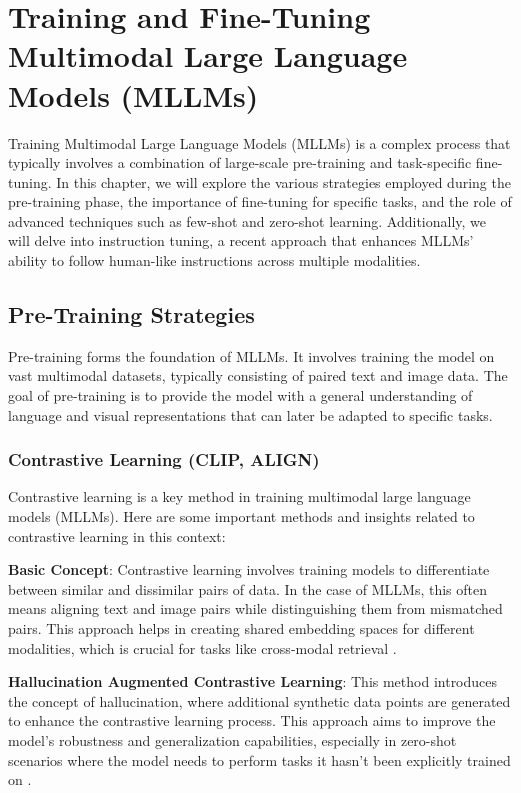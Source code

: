 \chapter{Training and Fine-Tuning Multimodal Large Language Models (MLLMs)}

Training Multimodal Large Language Models (MLLMs) is a complex process that typically involves a combination of large-scale pre-training and task-specific fine-tuning. In this chapter, we will explore the various strategies employed during the pre-training phase, the importance of fine-tuning for specific tasks, and the role of advanced techniques such as few-shot and zero-shot learning. Additionally, we will delve into instruction tuning, a recent approach that enhances MLLMs' ability to follow human-like instructions across multiple modalities.

\section{Pre-Training Strategies}

Pre-training forms the foundation of MLLMs. It involves training the model on vast multimodal datasets, typically consisting of paired text and image data. The goal of pre-training is to provide the model with a general understanding of language and visual representations that can later be adapted to specific tasks.

\subsection{Contrastive Learning (CLIP, ALIGN)}

Contrastive learning is a key method in training multimodal large language models (MLLMs). Here are some important methods and insights related to contrastive learning in this context:

\textbf{Basic Concept}: Contrastive learning involves training models to differentiate between similar and dissimilar pairs of data. In the case of MLLMs, this often means aligning text and image pairs while distinguishing them from mismatched pairs. This approach helps in creating shared embedding spaces for different modalities, which is crucial for tasks like cross-modal retrieval \cite{cite4}.

\textbf{Hallucination Augmented Contrastive Learning}: This method introduces the concept of hallucination, where additional synthetic data points are generated to enhance the contrastive learning process. This approach aims to improve the model's robustness and generalization capabilities, especially in zero-shot scenarios where the model needs to perform tasks it hasn't been explicitly trained on \cite{cite1, cite2}.

